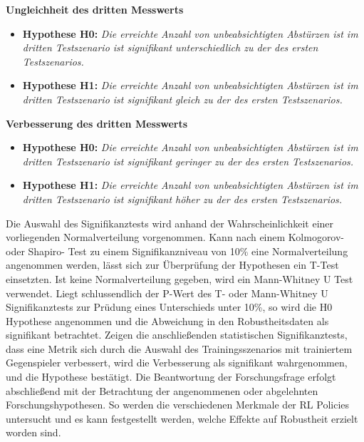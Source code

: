 \textbf{Ungleichheit des dritten Messwerts}
\begin{itemize}
    \item \textbf{Hypothese H0:} \textit{Die erreichte Anzahl von unbeabsichtigten Abstürzen ist im dritten Testszenario ist signifikant unterschiedlich zu der des ersten Testszenarios.}
    \item \textbf{Hypothese H1:} \textit{Die erreichte Anzahl von unbeabsichtigten Abstürzen ist im dritten Testszenario ist signifikant gleich zu der des ersten Testszenarios.}
\end{itemize}

\textbf{Verbesserung des dritten Messwerts}
\begin{itemize}
    \item \textbf{Hypothese H0:} \textit{Die erreichte Anzahl von unbeabsichtigten Abstürzen ist im dritten Testszenario ist signifikant geringer zu der des ersten Testszenarios.}
    \item \textbf{Hypothese H1:} \textit{Die erreichte Anzahl von unbeabsichtigten Abstürzen ist im dritten Testszenario ist signifikant höher zu der des ersten Testszenarios.}
\end{itemize}

Die Auswahl des Signifikanztests wird anhand der Wahrscheinlichkeit einer vorliegenden Normalverteilung vorgenommen.
Kann nach einem Kolmogorov- oder Shapiro- Test zu einem Signifikanzniveau von 10\% eine Normalverteilung angenommen werden, lässt sich zur Überprüfung der Hypothesen ein T-Test einsetzten.
Ist keine Normalverteilung gegeben, wird ein Mann-Whitney U Test verwendet.
Liegt schlussendlich der P-Wert des T- oder Mann-Whitney U Signifikanztests zur Prüdung eines Unterschieds unter 10\%, so wird die H0 Hypothese angenommen und die Abweichung in den Robustheitsdaten als signifikant betrachtet.
Zeigen die anschließenden statistischen Signifikanztests, dass eine Metrik sich durch die Auswahl des Trainingsszenarios mit trainiertem Gegenspieler verbessert, wird die Verbesserung als signifikant wahrgenommen, und die Hypothese bestätigt.
Die Beantwortung der Forschungsfrage erfolgt abschließend mit der Betrachtung der angenommenen oder abgelehnten Forschungshypothesen.
So werden die verschiedenen Merkmale der RL Policies untersucht und es kann festgestellt werden, welche Effekte auf Robustheit erzielt worden sind.
